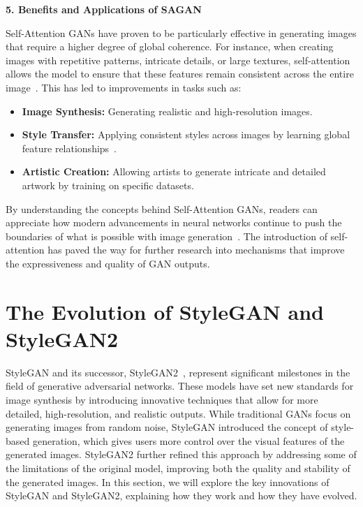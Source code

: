 \textbf{5. Benefits and Applications of SAGAN}

Self-Attention GANs have proven to be particularly effective in generating images that require a higher degree of global coherence. For instance, when creating images with repetitive patterns, intricate details, or large textures, self-attention allows the model to ensure that these features remain consistent across the entire image~\cite{zhang2019self}. This has led to improvements in tasks such as:
\begin{itemize}
    \item \textbf{Image Synthesis:} Generating realistic and high-resolution images.
    \item \textbf{Style Transfer:} Applying consistent styles across images by learning global feature relationships~\cite{karras2019style}.
    \item \textbf{Artistic Creation:} Allowing artists to generate intricate and detailed artwork by training on specific datasets.
\end{itemize}

By understanding the concepts behind Self-Attention GANs, readers can appreciate how modern advancements in neural networks continue to push the boundaries of what is possible with image generation~\cite{karras2019style}. The introduction of self-attention has paved the way for further research into mechanisms that improve the expressiveness and quality of GAN outputs.


\section{The Evolution of StyleGAN and StyleGAN2}

StyleGAN and its successor, StyleGAN2~\cite{karras2019style}, represent significant milestones in the field of generative adversarial networks. These models have set new standards for image synthesis by introducing innovative techniques that allow for more detailed, high-resolution, and realistic outputs. While traditional GANs focus on generating images from random noise, StyleGAN introduced the concept of style-based generation, which gives users more control over the visual features of the generated images. StyleGAN2 further refined this approach by addressing some of the limitations of the original model, improving both the quality and stability of the generated images. In this section, we will explore the key innovations of StyleGAN and StyleGAN2, explaining how they work and how they have evolved.

